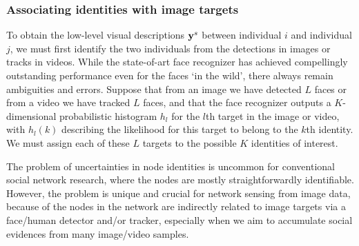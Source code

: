 \subsubsection{Associating identities with image targets}
\label{sec:assoc}

To obtain the low-level visual descriptions ${\bf y}^s$ between individual $i$ and individual $j$, we must first identify the two individuals from the detections in images or tracks in videos. While the state-of-art face recognizer has achieved compellingly outstanding performance even for the faces `in the wild', there always remain ambiguities and errors. Suppose that from an image we have detected $L$ faces or from a video we have tracked $L$ faces, and that the face recognizer outputs a $K$-dimensional probabilistic histogram $h_l$ for the $l$th target in the image or video, with $h_l(k)$ describing the likelihood for this target to belong to the $k$th identity. We must assign each of these $L$ targets to the possible $K$ identities of interest. 

The problem of uncertainties in node identities is uncommon for conventional social network research, where the nodes are mostly straightforwardly identifiable. However, the problem is unique and crucial for network sensing from image data, because of the nodes in the network are indirectly related to image targets via a face/human detector and/or tracker, especially when we aim to accumulate social evidences from many image/video samples.

